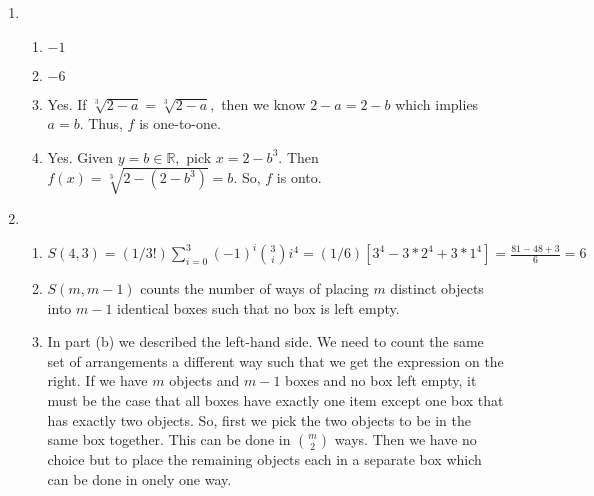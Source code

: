 \documentclass{amsart}
\newcommand{\real}{\mathbb{R}}
\begin{document}
\begin{enumerate}
\item \begin{enumerate}
\item $-1$ \item $-6$ \item Yes. If $\sqrt[3]{2-a}=\sqrt[3]{2-a},$ then we know $2-a=2-b$ which implies $a=b.$ Thus, $f$ is one-to-one.
\item Yes. Given $y=b \in \real,$ pick $x=2-b^3.$ Then $f(x)=\sqrt[3]{2-(2-b^3)}=b.$ So, $f$ is onto.
\end{enumerate}

\item \begin{enumerate} \item $S(4,3)= (1/3!)\sum_{i=0}^3 (-1)^i{3 \choose i} i^4= (1/6)[3^4 -3*2^4+3*1^4]=\frac{81-48+3}{6}=6$
\item $S(m,m-1)$ counts the number of ways of placing $m$ distinct objects into $m-1$ identical boxes such that no box is left empty.
\item In part (b) we described the left-hand side. We need to count the same set of arrangements a different way such that we get the expression on the right. If we have $m$ objects and $m-1$ boxes and no box left empty, it must be the case that all boxes have exactly one item except one box that has exactly two objects. So, first we pick the two objects to be in the same box together. This can be done in $m \choose 2$ ways. Then we have no choice but to place the remaining objects each in a separate box which can be done in onely one way.
\end{enumerate}

\end{enumerate}
\end{document}
